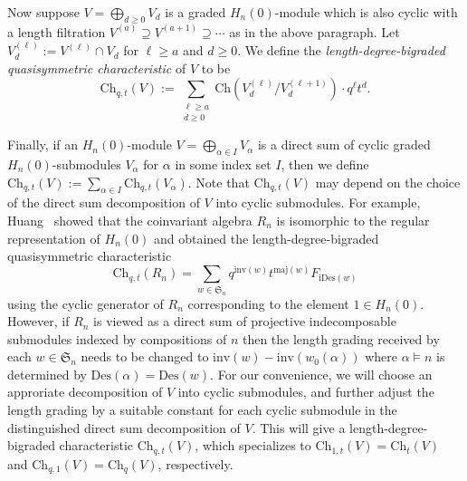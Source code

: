 \documentclass[ALCO,ThmDefs,published]{cedram}
\newcommand{\symm}{{\mathfrak{S}}}
\theoremstyle{plain}
\newcommand{\maj}{{\mathrm {maj}}}
\newcommand{\inv}{{\mathrm {inv}}}
\newcommand{\Des}{{\mathrm {Des}}}
\newcommand{\Ch}{{\mathrm {Ch}}}
\newcommand{\iDes}{{\mathrm {iDes}}}
\newcommand{\symm}{{\mathfrak{S}}}
\begin{document}

Now suppose $V = \bigoplus_{d \geq 0} V_d$ is a graded $H_n(0)$-module which is also cyclic with 
a length filtration $V^{(a)} \supseteq V^{(a+1)} \supseteq \cdots $ as in the above paragraph.
Let $V^{(\ell)}_d := V^{(\ell)} \cap V_d$ for $\ell \geq a$ and $d \geq 0$.
We define the \emph{length-degree-bigraded quasisymmetric characteristic} of $V$ to be
\begin{equation}
\Ch_{q,t}(V) := \sum_{\substack{\ell \geq a \\ d \geq 0}} \Ch \left( V^{(\ell)}_d \Big/ V^{(\ell+1)}_d \right) \cdot q^{\ell} t^d.
\end{equation} 


Finally, if an $H_n(0)$-module $V = \bigoplus_{\alpha \in I} V_{\alpha}$ 
is a direct sum of cyclic graded $H_n(0)$-submodules $V_{\alpha}$ for $\alpha$ in some index set $I$, 
then we 
define $\Ch_{q,t}(V) := \sum_{\alpha \in I} \Ch_{q,t}(V_{\alpha})$.
Note that $\Ch_{q,t}(V)$ may depend on the choice of the direct sum decomposition of $V$ into cyclic submodules.
For example, Huang~\cite{Huang} showed that the coinvariant algebra $R_n$ is isomorphic to the regular representation of $H_n(0)$ and obtained the length-degree-bigraded quasisymmetric characteristic
\begin{equation}
\Ch_{q,t} (R_n) = \sum_{w\in\symm_n} q^{\inv(w)} t^{\maj(w)} F_{\iDes(w)}
\end{equation}
using the cyclic generator of $R_n$ corresponding to the element $1\in H_n(0)$.
However, if $R_n$ is viewed as a direct sum of projective indecomposable submodules 
indexed by compositions of $n$ then the length grading received by each $w\in\symm_n$ needs to be changed to $\inv(w)-\inv(w_0(\alpha))$ where $\alpha\models n$ is determined by $\Des(\alpha) = \Des(w)$.
For our convenience, we will choose an approriate decomposition of $V$ into cyclic submodules, and further adjust the length grading by a suitable constant for each cyclic submodule in the distinguished direct sum decomposition of $V$.
This will give a length-degree-bigraded characteristic $\Ch_{q,t}(V)$, which specializes to $\Ch_{1,t}(V)=\Ch_t(V)$ and $\Ch_{q,1}(V)=\Ch_q(V)$, respectively.
\end{document}
